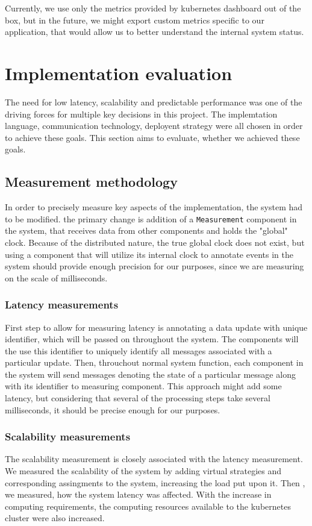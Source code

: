 Currently, we use only the metrics provided by kubernetes dashboard out of the box, but in the future, we might export
custom metrics specific to our application, that would allow us to better understand the internal system status.

\section{Implementation evaluation}
The need for low latency, scalability and predictable performance was one of the driving forces for multiple key decisions in this project.
The implemtation language, communication technology, deployent strategy were all chosen in order to achieve these goals.
This section aims to evaluate, whether we achieved these goals.

\subsection{Measurement methodology}
In order to precisely measure key aspects of the implementation, the system had to be modified. the primary change
is addition of a \verb|Measurement| component in the system, that receives data from other components and holds the
"global" clock. Because of the distributed nature, the true global clock does not exist, but using a component that
will utilize its internal clock to annotate events in the system should provide enough precision for our purposes, since
we are measuring on the scale of milliseconds.

\subsubsection{Latency measurements}
First step to allow for measuring latency is annotating a data update with unique identifier, which will be passed on throughout the system.
The components will the use this identifier to uniquely identify all messages associated with a particular update.
Then, throuchout normal system function, each component in the system will send messages denoting the state of a particular message along with its identifier
to measuring component. This approach might add some latency, but considering that several of the processing steps
take several milliseconds, it should be precise enough for our purposes.

\subsubsection{Scalability measurements}
The scalability measurement is closely associated with the latency measurement. We measured the scalability of the system
by adding virtual strategies and corresponding assingments to the system, increasing the load put upon it. Then , we measured,
how the system latency was affected. With the increase in computing requirements, the computing resources
available to the kubernetes cluster were also increased.


